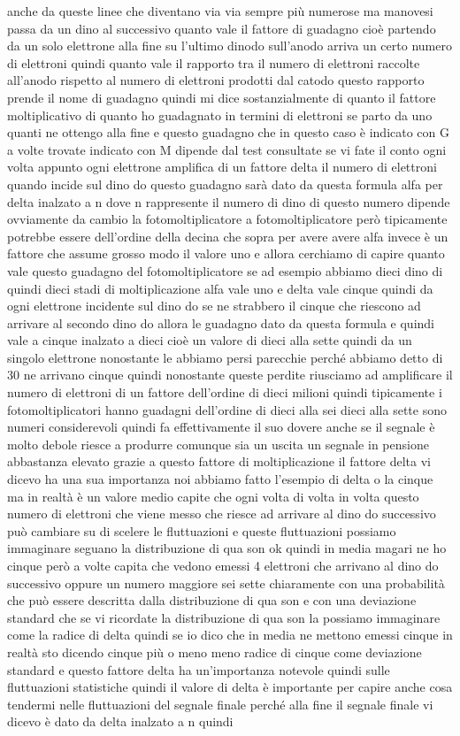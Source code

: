 anche da queste linee che diventano via via sempre più numerose ma manovesi passa da un dino al successivo quanto vale il fattore di guadagno cioè partendo da un solo elettrone alla fine su l'ultimo dinodo sull'anodo arriva un certo numero di elettroni quindi quanto vale il rapporto tra il numero di elettroni raccolte all'anodo rispetto al numero di elettroni prodotti dal catodo questo rapporto prende il nome di guadagno quindi mi dice sostanzialmente di quanto il fattore moltiplicativo di quanto ho guadagnato in termini di elettroni se parto da uno quanti ne ottengo alla fine e questo guadagno che in questo caso è indicato con G a volte trovate indicato con M dipende dal test consultate se vi fate il conto ogni volta appunto ogni elettrone amplifica di un fattore delta il numero di elettroni quando incide sul dino do questo guadagno sarà dato da questa formula alfa per delta inalzato a n dove n rappresente il numero di dino di questo numero dipende ovviamente da cambio la fotomoltiplicatore a fotomoltiplicatore però tipicamente potrebbe essere dell'ordine della decina che sopra per avere avere alfa invece è un fattore che assume grosso modo il valore uno e allora cerchiamo di capire quanto vale questo guadagno del fotomoltiplicatore se ad esempio abbiamo dieci dino di quindi dieci stadi di moltiplicazione alfa vale uno e delta vale cinque quindi da ogni elettrone incidente sul dino do se ne strabbero il cinque che riescono ad arrivare al secondo dino do allora le guadagno dato da questa formula e quindi vale a cinque inalzato a dieci cioè un valore di dieci alla sette quindi da un singolo elettrone nonostante le abbiamo persi parecchie perché abbiamo detto di 30 ne arrivano cinque quindi nonostante queste perdite riusciamo ad amplificare il numero di elettroni di un fattore dell'ordine di dieci milioni quindi tipicamente i fotomoltiplicatori hanno guadagni dell'ordine di dieci alla sei dieci alla sette sono numeri considerevoli quindi fa effettivamente il suo dovere anche se il segnale è molto debole riesce a produrre comunque sia un uscita un segnale in pensione abbastanza elevato grazie a questo fattore di moltiplicazione il fattore delta vi dicevo ha una sua importanza noi abbiamo fatto l'esempio di delta o la cinque ma in realtà è un valore medio capite che ogni volta di volta in volta questo numero di elettroni che viene messo che riesce ad arrivare al dino do successivo può cambiare su di scelere le fluttuazioni e queste fluttuazioni possiamo immaginare seguano la distribuzione di qua son ok quindi in media magari ne ho cinque però a volte capita che vedono emessi 4 elettroni che arrivano al dino do successivo oppure un numero maggiore sei sette chiaramente con una probabilità che può essere descritta dalla distribuzione di qua son e con una deviazione standard che se vi ricordate la distribuzione di qua son la possiamo immaginare come la radice di delta quindi se io dico che in media ne mettono emessi cinque in realtà sto dicendo cinque più o meno meno radice di cinque come deviazione standard e questo fattore delta ha un'importanza notevole quindi sulle fluttuazioni statistiche quindi il valore di delta è importante per capire anche cosa tendermi nelle fluttuazioni del segnale finale perché alla fine il segnale finale vi dicevo è dato da delta inalzato a n quindi 